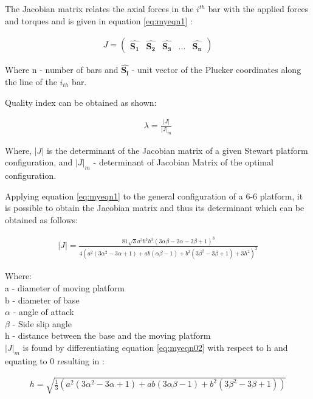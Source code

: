 The Jacobian matrix relates the axial forces in the $i^{th}$ bar with the applied
forces and torques and is given in equation \eqref{eq:myeqn1} \cite{fernandes_design_nodate}:

\begin{ceqn}
	\begin{align}
		J =
		\begin{pmatrix}
			\hat{\boldsymbol{S_{1}}} & \hat{\boldsymbol{S_{2}}} & \hat{\boldsymbol{S_{3}}} & ... & \hat{\boldsymbol{S_{n}}}
		\end{pmatrix}
		\label{eq:myeqn1}
	\end{align}
\end{ceqn}

Where n - number of bars and $ \hat{\boldsymbol{S_{i}}}$ - unit vector of the Plucker coordinates along the line of the
$i_{th}$ bar.

Quality index can be obtained as shown:
\begin{ceqn}
	\begin{align}
		\lambda = \frac{|J|}{|J|_{m}}
		\label{eq:myeqn}
	\end{align}
\end{ceqn}
Where, $|J|$ is the determinant of the Jacobian matrix of a given Stewart platform configuration, and $ |J|_{m} $ - determinant of Jacobian Matrix of the optimal configuration.

Applying equation \eqref{eq:myeqn1} to the general configuration of a 6-6 platform, it is
possible to obtain the Jacobian matrix and thus its determinant which can be obtained as follows:
\begin{ceqn}
	\begin{align}
		|J| =
		\frac{81 \sqrt{3} a^3 b^3 h^3 (3 \alpha \beta - 2 \alpha - 2 \beta +1)^3}{4(a^2(3 \alpha^2 - 3 \alpha + 1)+ ab(\alpha \beta - 1 )+ b^2(3 \beta^2 - 3 \beta + 1)+ 3h^2)^3}
		\label{eq:myeqn02}
	\end{align}
\end{ceqn}
Where:\\
a - diameter of moving platform\\
b - diameter of base\\
$\alpha$ - angle of attack\\
$ \beta $ - Side slip angle\\
h - distance between the base and the moving platform\\

$|J|_{m}$ is found by differentiating equation \eqref{eq:myeqn02} with respect to h and equating to 0 resulting in \cite{fernandes_design_nodate}:
\begin{ceqn}
	\begin{align}
		h = \sqrt{\frac{1}{3}(a^2 (3 \alpha^2 - 3 \alpha + 1)+ ab (3\alpha\beta - 1)+b^2(3 \beta^2 - 3 \beta + 1))}
		\label{eq:myeqn3}
	\end{align}
\end{ceqn}

